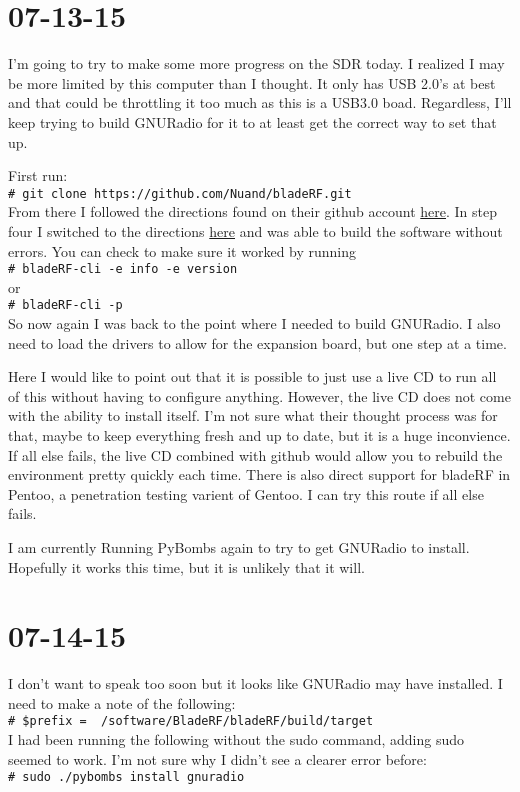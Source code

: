 \documentclass{article}
\newcommand{\shellcmd}[1]{\\\indent\indent\texttt{\footnotesize\# #1}\\}
\begin{document}
	\section{07-13-15}
	I'm going to try to make some more progress on the SDR today. I realized I may be more limited by this computer
	than I thought. It only has USB 2.0's at best and that could be throttling it too much as this is a USB3.0 boad.
	Regardless, I'll keep trying to build GNURadio for it to at least get the correct way to set that up. 

	First run: \shellcmd{git clone https://github.com/Nuand/bladeRF.git}
	
	From there I followed the directions found on their github account 
	\href{https://github.com/Nuand/bladeRF}{here}. In step four I switched to the directions
	\href{https://github.com/Nuand/bladeRF/tree/master/host}{here} and was able to build the software without errors.
	You can check to make sure it worked by running \shellcmd{bladeRF-cli -e info -e version} or
	\shellcmd{bladeRF-cli -p} So now again I was back to the point where I needed to build GNURadio. I also need to
	load the drivers to allow for the expansion board, but one step at a time. 

	Here I would like to point out that it is possible to just use a live CD to run all of this without having
	to configure anything. However, the live CD does not come with the ability to install itself. I'm not sure
	what their thought process was for that, maybe to keep everything fresh and up to date, but it is a huge inconvience. 
	If all else fails, the live CD combined with github would allow you to rebuild the environment pretty quickly each time.
	There is also direct support for bladeRF in Pentoo, a penetration testing varient of Gentoo. I can try this route if all
	else fails. 

	I am currently Running PyBombs again to try to get GNURadio to install. Hopefully it works this time, but it is
	unlikely that it will. 	
	
	\section{07-14-15}
	I don't want to speak too soon but it looks like GNURadio may have installed. I need to make a note of the following:
	\shellcmd{ \$prefix = ~/software/BladeRF/bladeRF/build/target}

	I had been running the following without the sudo command, adding sudo seemed to work. I'm not sure why I didn't see
	a clearer error before:
	\shellcmd{ sudo ./pybombs install gnuradio }
	
\end{document}
